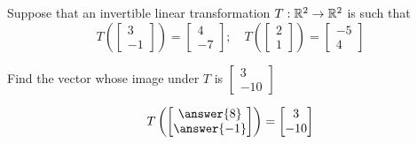 \documentclass{ximera}
\author{}
\begin{document}
\begin{exercise}
Suppose that an invertible linear transformation $T:\mathbb{R}^2\rightarrow \mathbb{R}^2$ is such that
$$T\left(\begin{bmatrix}3\\-1\end{bmatrix}\right)=\begin{bmatrix}4\\-7\end{bmatrix};\quad T\left(\begin{bmatrix}2\\1\end{bmatrix}\right)=\begin{bmatrix}-5\\4\end{bmatrix}$$

Find the vector whose image under $T$ is $\begin{bmatrix}3\\-10\end{bmatrix}$

$$T\left(\begin{bmatrix}\answer{8}\\\answer{-1}\end{bmatrix}\right)=\begin{bmatrix}3\\-10\end{bmatrix}$$

 \end{exercise}
 
\end{document}
